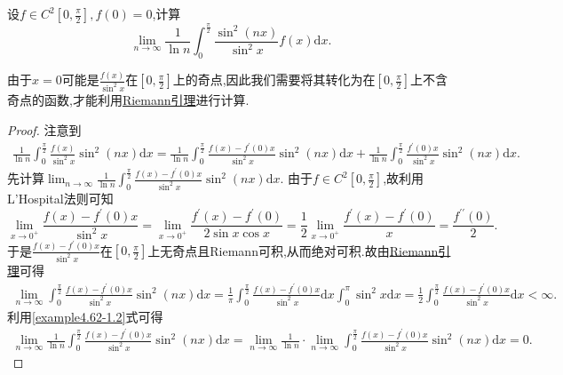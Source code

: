 \documentclass[../../main.tex]{subfiles}%
\begin{document}
\begin{example}
设\(f\in C^{2}[0,\frac{\pi}{2}],f(0)=0\),计算
\[
\lim_{n\rightarrow\infty}\frac{1}{\ln n}\int_{0}^{\frac{\pi}{2}}\frac{\sin^{2}(nx)}{\sin^{2}x}f(x)\mathrm{d}x.
\]
\end{example}
\begin{remark}
由于\(x = 0\)可能是\(\frac{f(x)}{\sin^2x}\)在\(\left[0, \frac{\pi}{2}\right]\)上的奇点,因此我们需要将其转化为在\(\left[0, \frac{\pi}{2}\right]\)上不含奇点的函数,才能利用\hyperref[theorem:Riemann引理]{Riemann引理}进行计算.
\end{remark}
\begin{proof}

注意到
\begin{align}\label{example4.62-1.1}
\frac{1}{\ln n}\int_0^{\frac{\pi}{2}}{\frac{f(x)}{\sin^2x}\sin^2(nx)\mathrm{d}x}=\frac{1}{\ln n}\int_0^{\frac{\pi}{2}}{\frac{f(x) - f^\prime(0)x}{\sin^2x}\sin^2(nx)\mathrm{d}x}+\frac{1}{\ln n}\int_0^{\frac{\pi}{2}}{\frac{f^\prime(0)x}{\sin^2x}\sin^2(nx)\mathrm{d}x}. 
\end{align}
先计算\(\lim_{n\rightarrow \infty} \frac{1}{\ln n}\int_0^{\frac{\pi}{2}}{\frac{f(x) - f^\prime(0)x}{\sin^2x}\sin^2(nx)\mathrm{d}x}\).
由于\(f\in C^2\left[0, \frac{\pi}{2}\right]\),故利用L'Hospital法则可知
\[
\lim_{x\rightarrow 0^+} \frac{f(x) - f^\prime(0)x}{\sin^2x}=\lim_{x\rightarrow 0^+} \frac{f^\prime(x) - f^\prime(0)}{2\sin x\cos x}=\frac{1}{2}\lim_{x\rightarrow 0^+} \frac{f^\prime(x) - f^\prime(0)}{x}=\frac{f^{\prime\prime}(0)}{2}.
\]
于是\(\frac{f(x) - f^\prime(0)x}{\sin^2x}\)在\(\left[0, \frac{\pi}{2}\right]\)上无奇点且Riemann可积,从而绝对可积.故由\hyperref[theorem:Riemann引理]{Riemann引理}可得
\begin{align}
\lim_{n\rightarrow \infty} \int_0^{\frac{\pi}{2}}{\frac{f(x) - f^\prime(0)x}{\sin^2x}\sin^2(nx)\mathrm{d}x}=\frac{1}{\pi}\int_0^{\frac{\pi}{2}}{\frac{f(x) - f^\prime(0)x}{\sin^2x}\mathrm{d}x}\int_0^{\pi}{\sin^2x\mathrm{d}x}
= \frac{1}{2}\int_0^{\frac{\pi}{2}}{\frac{f(x) - f^\prime(0)x}{\sin^2x}\mathrm{d}x}<\infty. \label{example4.62-1.2}
\end{align}
利用\eqref{example4.62-1.2}式可得
\begin{align}\label{example4.62-1.3}
\lim_{n\rightarrow \infty} \frac{1}{\ln n}\int_0^{\frac{\pi}{2}}{\frac{f(x) - f^\prime(0)x}{\sin^2x}\sin^2(nx)\mathrm{d}x}=\lim_{n\rightarrow \infty} \frac{1}{\ln n}\cdot \lim_{n\rightarrow \infty} \int_0^{\frac{\pi}{2}}{\frac{f(x) - f^\prime(0)x}{\sin^2x}\sin^2(nx)\mathrm{d}x}=0.  
\end{align}

\end{proof}
\end{document}
